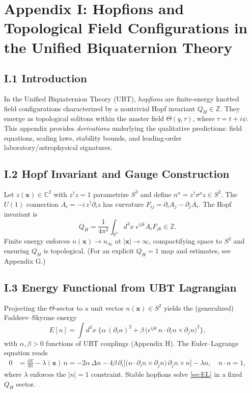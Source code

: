 
\appendix
\section*{Appendix I: Hopfions and Topological Field Configurations in the Unified Biquaternion Theory}

\subsection*{I.1 Introduction}
In the Unified Biquaternion Theory (UBT), \emph{hopfions} are finite-energy knotted field configurations characterized by a nontrivial Hopf invariant $Q_H\in\mathbb{Z}$. 
They emerge as topological solitons within the master field $\Theta(q,\tau)$, where $\tau=t+i\psi$. 
This appendix provides \emph{derivations} underlying the qualitative predictions: field equations, scaling laws, stability bounds, and leading-order laboratory/astrophysical signatures.

\subsection*{I.2 Hopf Invariant and Gauge Construction}
Let $z(\mathbf{x})\in\mathbb{C}^2$ with $z^\dagger z=1$ parametrize $S^3$ and define $n^a=z^\dagger\sigma^a z\in S^2$.
The $U(1)$ connection $A_i=-i\,z^\dagger\partial_i z$ has curvature $F_{ij}=\partial_i A_j-\partial_j A_i$. 
The Hopf invariant is
\begin{equation}
Q_H=\frac{1}{4\pi^2}\int_{\mathbb{R}^3} d^3x\; \epsilon^{ijk} A_i F_{jk}\in\mathbb{Z}.
\label{eq:HopfQ}
\end{equation}
Finite energy enforces $n(\mathbf{x})\to n_\infty$ at $|\mathbf{x}|\to\infty$, compactifying space to $S^3$ and ensuring $Q_H$ is topological. 
(For an explicit $Q_H{=}1$ map and estimates, see Appendix G.)

\subsection*{I.3 Energy Functional from UBT Lagrangian}
Projecting the $\Theta$-sector to a unit vector $n(\mathbf{x})\in S^2$ yields the (generalized) Faddeev--Skyrme energy
\begin{equation}
E[n]=\int d^3x\;\Big\{\alpha\,(\partial_i n)^2+\beta\, \big(\epsilon^{ijk}\,n\cdot\partial_i n\times\partial_j n\big)^2 \Big\},
\label{eq:FSenergy}
\end{equation}
with $\alpha,\beta>0$ functions of UBT couplings (Appendix H). 
The Euler--Lagrange equation reads
\begin{align}
0&=\frac{\delta E}{\delta n}-\lambda(\mathbf{x})\,n
= -2\alpha\,\Delta n -4\beta\,\partial_i\Big[ \big(n\cdot\partial_i n\times\partial_j n\big)\, \partial_j n\times n \Big]-\lambda n,\quad n\cdot n=1,
\label{eq:EL}
\end{align}
where $\lambda$ enforces the $|n|=1$ constraint. 
Stable hopfions solve \eqref{eq:EL} in a fixed $Q_H$ sector.

